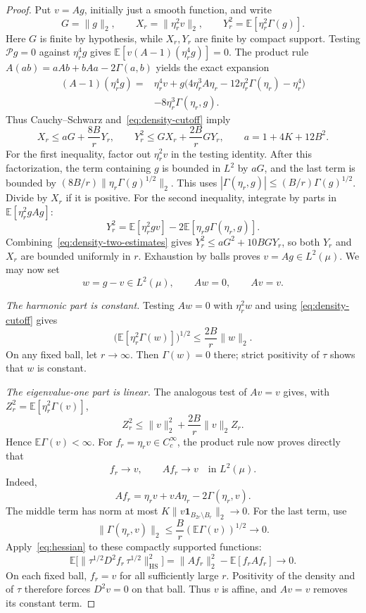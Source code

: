 \begin{proof}
Put $v=Ag$, initially just a smooth function, and write
\[
 G=\|g\|_2,\qquad
 X_r=\|\eta_r^2v\|_2,\qquad
 Y_r^2=\mathbb{E}[\eta_r^2\Gamma(g)].
\]
Here $G$ is finite by hypothesis, while $X_r,Y_r$ are finite by compact support. Testing $\mathcal{P} g=0$ against $\eta_r^4g$ gives $\mathbb{E}[v(A-1)(\eta_r^4g)]=0$. The product rule $A(ab)=aAb+bAa-2\Gamma(a,b)$ yields the exact expansion
\[
 \begin{split}
 (A-1)(\eta_r^4g)
 ={}&\eta_r^4v
 +g\bigl(4\eta_r^3A\eta_r-12\eta_r^2\Gamma(\eta_r)-\eta_r^4\bigr)\\
 &-8\eta_r^3\Gamma(\eta_r,g).
 \end{split}
\]
Thus Cauchy--Schwarz and~\eqref{eq:density-cutoff} imply
\begin{equation}\label{eq:density-two-estimates}
 X_r\le aG+\frac{8B}{r}Y_r,
 \qquad
 Y_r^2\le GX_r+\frac{2B}{r}GY_r,
 \qquad a=1+4K+12B^2.
\end{equation}
For the first inequality, factor out $\eta_r^2v$ in the testing identity. After this factorization, the term containing $g$ is bounded in $L^2$ by $aG$, and the last term is bounded by $(8B/r)\|\eta_r\Gamma(g)^{1/2}\|_2$. This uses $|\Gamma(\eta_r,g)|\le(B/r)\Gamma(g)^{1/2}$. Divide by $X_r$ if it is positive. For the second inequality, integrate by parts in $\mathbb E[\eta_r^2gAg]$:
\[
 Y_r^2=\mathbb{E}[\eta_r^2gv]-2\mathbb{E}[\eta_rg\Gamma(\eta_r,g)].
\]
Combining~\eqref{eq:density-two-estimates} gives $Y_r^2\le aG^2+10BGY_r$, so both $Y_r$ and $X_r$ are bounded uniformly in $r$.  Exhaustion by balls proves $v=Ag\in L^2(\mu)$.  We may now set
\[
 w=g-v\in L^2(\mu),\qquad Aw=0,\qquad Av=v.
\]

\smallskip \noindent\emph{The harmonic part is constant.} Testing $Aw=0$ with $\eta_r^2w$ and using \eqref{eq:density-cutoff} gives
\[
 \bigl(\mathbb{E}[\eta_r^2\Gamma(w)]\bigr)^{1/2}
 \le\frac{2B}{r}\|w\|_2.
\]
On any fixed ball, let $r\to\infty$.  Then $\Gamma(w)=0$ there; strict positivity of $\tau$ shows that $w$ is constant.

\smallskip \noindent\emph{The eigenvalue-one part is linear.} The analogous test of $Av=v$ gives, with $Z_r^2=\mathbb{E}[\eta_r^2\Gamma(v)]$,
\[
 Z_r^2\le\|v\|_2^2+\frac{2B}{r}\|v\|_2Z_r.
\]
Hence $\mathbb{E}\Gamma(v)<\infty$.  For $f_r=\eta_rv\in C_c^\infty$, the product rule now proves directly that
\begin{equation}\label{eq:density-approximation}
 f_r\longrightarrow v,\qquad Af_r\longrightarrow v
 \quad\text{in }L^2(\mu).
\end{equation}
Indeed,
\[
 Af_r=\eta_rv+vA\eta_r-2\Gamma(\eta_r,v).
\]
The middle term has norm at most $K\|v\mathbf{1}_{B_{2r}\setminus B_r}\|_2\to0$.  For the last term, use
\[
 \|\Gamma(\eta_r,v)\|_2
 \le\frac{B}{r}(\mathbb{E}\Gamma(v))^{1/2}\longrightarrow0.
\]
Apply~\eqref{eq:hessian} to these compactly supported functions:
\[
 \mathbb{E}\bigl[\|\tau^{1/2}D^2f_r\,\tau^{1/2}\|_{\mathrm{HS}}^2\bigr]
 =\|Af_r\|_2^2-\mathbb{E}[f_rAf_r]\longrightarrow0.
\]
On each fixed ball, $f_r=v$ for all sufficiently large $r$.  Positivity of the density and of $\tau$ therefore forces $D^2v=0$ on that ball. Thus $v$ is affine, and $Av=v$ removes its constant term.


\end{proof}
